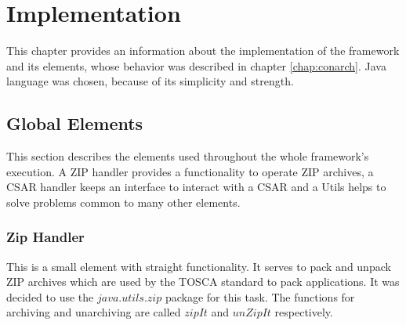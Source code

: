 
\chapter{Implementation}\label{chap:imp}
This chapter provides an information about the implementation of the framework and its elements, whose behavior was described in chapter \ref{chap:conarch}.
Java language was chosen, because of its simplicity and strength. 


\section{Global Elements}
This section describes the elements used throughout the whole framework's execution.
A ZIP handler provides a functionality to operate ZIP archives, a CSAR handler keeps an interface to interact with a CSAR and a Utils helps to solve problems common to many other elements.

\subsection*{Zip Handler}
This is a small element with straight functionality. 
It serves to pack and unpack ZIP archives which are used by the TOSCA standard to pack applications.
It was decided to use the $java$.$utils$.$zip$ package for this task.
The functions for archiving and unarchiving are called $zipIt$ and $unZipIt$ respectively. 

